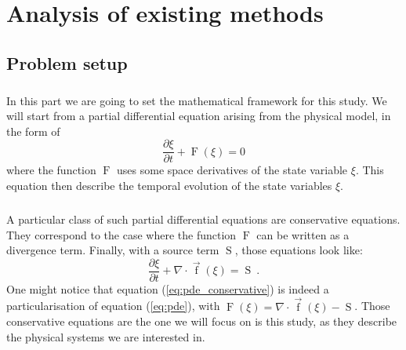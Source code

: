 \chapter{Analysis of existing methods}

  \section{Problem setup}

    \paragraph{}
    In this part we are going to set the mathematical framework for this study.
    We will start from a partial differential equation arising from the physical model, in the form of
    \begin{equation}\label{eq:pde}
      \frac{\partial \xi}{\partial t} + \operatorname{F}\left(\xi\right) = 0
    \end{equation}
    where the function $\operatorname{F}$ uses some space derivatives of the state variable $\xi$.
    This equation then describe the temporal evolution of the state variables $\xi$.

    \paragraph{}
    A particular class of such partial differential equations are conservative equations.
    They correspond to the case where the function $\operatorname{F}$ can be written as a divergence term.
    Finally, with a source term $\operatorname{S}$, those equations look like:
    \begin{equation}\label{eq:pde_conservative}
      \frac{\partial \xi}{\partial t} + \nabla \cdot \vec{\operatorname{f}}\left(\xi\right) = \operatorname{S}\ .
    \end{equation}
    One might notice that equation (\ref{eq:pde_conservative}) is indeed a particularisation of equation (\ref{eq:pde}), with $\operatorname{F}\left(\xi\right) = \nabla\cdot \vec{\operatorname{f}}\left(\xi\right) - \operatorname{S}$.
    Those conservative equations are the one we will focus on is this study, as they describe the physical systems we are interested in.

